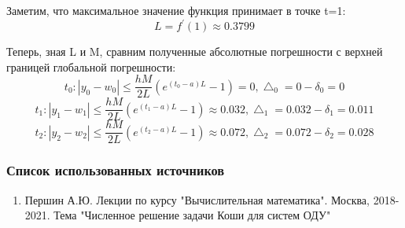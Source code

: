 \documentclass[12pt,a4paper]{article}
\begin{document}
Заметим, что максимальное значение функция принимает в точке t=1:
\begin{equation}
	L = f^{'}(1) \approx 0.3799
\end{equation}

Теперь, зная L и M, сравним полученные абсолютные погрешности с верхней границей глобальной погрешности:
\begin{equation}
	t_0: \left |  y_0 - w_0 \right | \leq \frac{hM}{2L} (e^{(t_{0} - a)L} - 1) =  0, \bigtriangleup_0 = 0 - \delta_0 = 0
\end{equation}
\begin{equation}
	t_1: \left |  y_1 - w_1 \right | \leq \frac{hM}{2L} (e^{(t_{1} - a)L} - 1) \approx 0.032, \bigtriangleup_1 = 0.032 - \delta_1 = 0.011  
\end{equation}
\begin{equation}
	t_2: \left |  y_2 - w_2 \right | \leq \frac{hM}{2L} (e^{(t_{2} - a)L} - 1) \approx 0.072, \bigtriangleup_2 = 0.072 - \delta_2 = 0.028
\end{equation}
\subsubsection*{Список использованных источников}

\begin{enumerate}
	\item Першин А.Ю. Лекции по курсу "Вычислительная математика". Москва, 2018-2021. Тема "Численное решение задачи Коши для систем ОДУ"
\end{enumerate}
\end{document}
